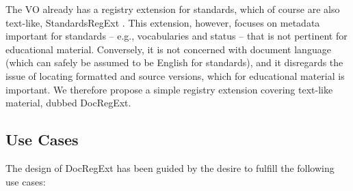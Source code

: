 \documentclass{ivoa}
\begin{document}
The VO already has a registry extension for standards, which of
course are also text-like, StandardsRegExt \citep{2012ivoa.spec.0508H}.  This extension,
however, focuses on metadata important for standards – e.g.,
vocabularies and status – that is not pertinent for educational
material.  Conversely, it is not concerned with document language (which
can safely be assumed to be English for standards), and it disregards
the issue of locating formatted and source versions, which for educational
material is important.  We therefore propose a simple registry extension
covering text-like material, dubbed DocRegExt.


\subsection{Use Cases}

\label{sect:regext-usecases}

The design of DocRegExt has been guided by the desire to fulfill the
following use cases:
\end{document}
